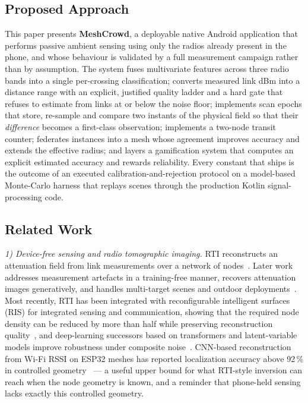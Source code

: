 \documentclass[journal,10pt]{IEEEtran}
\begin{document}
\subsection{Proposed Approach}
This paper presents \textbf{MeshCrowd}, a deployable native Android
application that performs passive ambient sensing using only the radios already
present in the phone, and whose behaviour is validated by a full measurement
campaign rather than by assumption. The system fuses multivariate features
across three radio bands into a single per-crossing classification; converts
measured link dBm into a distance range with an explicit, justified quality
ladder and a hard gate that refuses to estimate from links at or below the
noise floor; implements scan epochs that store, re-sample and compare two
instants of the physical field so that their \emph{difference} becomes a
first-class observation; implements a two-node transit counter; federates
instances into a mesh whose agreement improves accuracy and extends the
effective radius; and layers a gamification system that computes an explicit
estimated accuracy and rewards reliability. Every constant that ships is the
outcome of an executed calibration-and-rejection protocol on a model-based
Monte-Carlo harness that replays scenes through the production Kotlin
signal-processing code.

\subsection{Related Work}
\textit{1) Device-free sensing and radio tomographic imaging.} RTI reconstructs
an attenuation field from link measurements over a network of
nodes~\cite{wilson2010}. Later work addresses measurement artefacts in a
training-free manner, recovers attenuation images generatively, and handles
multi-target scenes and outdoor deployments~\cite{alippi2016,wu2024}. Most
recently, RTI has been integrated with reconfigurable intelligent surfaces (RIS)
for integrated sensing and communication, showing that the required node
density can be reduced by more than half while preserving reconstruction
quality~\cite{li2024}, and deep-learning successors based on transformers and
latent-variable models improve robustness under composite noise~\cite{wu2024}.
CNN-based reconstruction from Wi-Fi RSSI on ESP32 meshes has reported
localization accuracy above 92\,\% in controlled geometry~\cite{cnnrti2025} ---
a useful upper bound for what RTI-style inversion can reach when the node
geometry is known, and a reminder that phone-held sensing lacks exactly this
controlled geometry.
\end{document}

